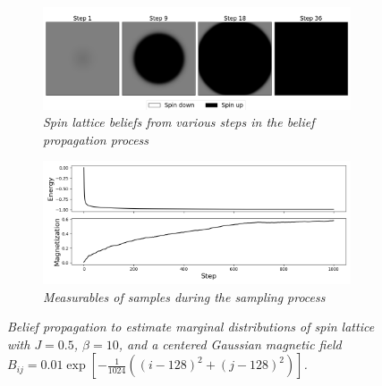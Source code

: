 \documentclass{article}
\begin{document}
\begin{figure}
    \begin{subfigure}{\textwidth}
        \includegraphics[width=\textwidth]{report_bp_gaussian}
        \centering
        \caption{\textit{Spin lattice beliefs from various steps in the belief propagation process}}
        \label{fig:bp_gaussian_a}
    \end{subfigure}
    \begin{subfigure}{\textwidth}
        \includegraphics[width=\textwidth]{report_mcmc_gaussian_measurables}
        \centering
        \caption{\textit{Measurables of samples during the sampling process}}
        \label{fig:bp_gaussian_b}
    \end{subfigure}
    \centering
    \caption{\textit{
        Belief propagation to estimate marginal distributions of spin lattice 
        with $J = 0.5$, $\beta = 10$, and a centered Gaussian 
        magnetic field
        $B_{ij} = 0.01 \exp [-\frac{1}{1024}((i-128)^2 + (j-128)^2)]$. 
    }}
    \label{fig:bp_gaussian}
\end{figure}

\newpage

\end{document}
